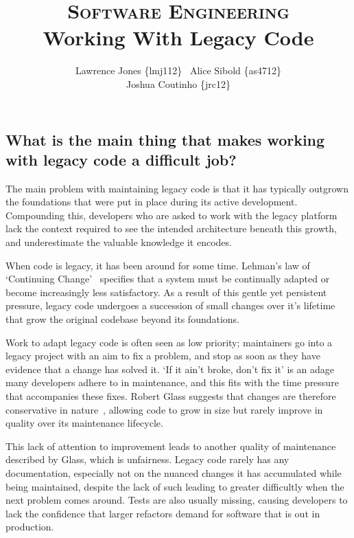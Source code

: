 \documentclass[11pt]{article}
\title{\textsc{Software Engineering}\\Working With Legacy Code}
\author{Lawrence Jones \{lmj112\} \  Alice Sibold \{as4712\} \\
        Joshua Coutinho \{jrc12\}}
\date{}
\begin{document}
\maketitle


\subsection*{What is the main thing that makes working with legacy code a
difficult job?}

The main problem with maintaining legacy code is that it has typically outgrown
the foundations that were put in place during its active development.
Compounding this, developers who are asked to work with the legacy platform lack
the context required to see the intended architecture beneath this growth, and
underestimate the valuable knowledge it encodes.

When code is legacy, it has been around for some time. Lehman's law of
`Continuing Change'~\cite{lehman} specifies that a system must be continually
adapted or become increasingly less satisfactory. As a result of this gentle yet
persistent pressure, legacy code undergoes a succession of small changes over
it's lifetime that grow the original codebase beyond its foundations.

Work to adapt legacy code is often seen as low priority; maintainers go into a
legacy project with an aim to fix a problem, and stop as soon as they have
evidence that a change has solved it. `If it ain't broke, don't fix it' is an
adage many developers adhere to in maintenance, and this fits with the time
pressure that accompanies these fixes. Robert Glass suggests that changes are
therefore conservative in nature~\cite{softwareConflict}, allowing code to grow
in size but rarely improve in quality over its maintenance lifecycle.

This lack of attention to improvement leads to another quality of maintenance
described by Glass, which is unfairness. Legacy code rarely has any
documentation, especially not on the nuanced changes it has accumulated while
being maintained, despite the lack of such leading to greater difficultly when
the next problem comes around. Tests are also usually missing, causing
developers to lack the confidence that larger refactors demand for software that
is out in production.
\end{document}
